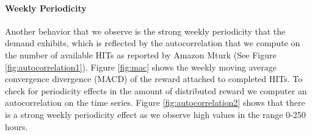 \paragraph{Weekly Periodicity}
Another behavior that we observe is the strong weekly periodicity that the demand exhibits, which is reflected by the autocorrelation that we compute on the number of available HITs as reported by Amazon Mturk (See Figure \ref{fig:autocorrelation1}). 
Figure \ref{fig:mac} shows the weekly moving average convergence divergence (MACD) of the reward attached to completed HITs. To check for periodicity effects in the amount of distributed reward we computer an autocorrelation on the time series. Figure \ref{fig:autocorrelation2} shows that there is a strong weekly periodicity effect as we observe high values in the range 0-250 hours. 

